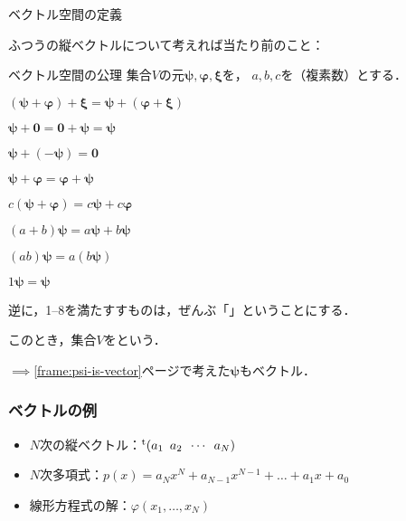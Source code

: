 \documentclass[
    10pt,
    ]{sotsu-beamer}
\begin{document}
\begin{frame}{ベクトル空間の定義}

    ふつうの縦ベクトルについて考えれば当たり前のこと：
    \begin{block}{ベクトル空間の公理}
        集合$V$の元$\symbf{\psi}, \symbf{\varphi}, \symbf{\xi}$を，
        $a, b, c$を（複素数）とする．
        \begin{enumerate}
            \begin{multicols}{2}
                \item $(\symbf{\psi} + \symbf{\varphi}) + \symbf{\xi} = \symbf{\psi} + (\symbf{\varphi} + \symbf{\xi})$
                \item $\symbf{\psi} + \symbf{0} = \symbf{0} + \symbf{\psi} = \symbf{\psi}$
                \item $\symbf{\psi} + (-\symbf{\psi}) = \symbf{0}$
                \item $\symbf{\psi} + \symbf{\varphi} = \symbf{\varphi} + \symbf{\psi}$
                \item $c (\symbf{\psi} + \symbf{\varphi}) = c \symbf{\psi} + c \symbf{\varphi}$
                \item $(a + b) \symbf{\psi} = a \symbf{\psi} + b \symbf{\psi}$
                \item $(ab) \symbf{\psi} = a(b\symbf{\psi})$
                \item $1 \symbf{\psi} = \symbf{\psi}$
            \end{multicols}
        \end{enumerate}
    \end{block}

    \pause

    \alert{逆に，1--8を満たすすものは，ぜんぶ「」ということにする}．
    
    このとき，集合$V$をという．
    
    $\implies$\ref{frame:psi-is-vector}ページで考えた$\symbf{\psi}$もベクトル．

\end{frame}


\begin{frame}
    \frametitle{ベクトルの例}

    \begin{itemize}
        \item $N$次の縦ベクトル：$\cvector{a_1 ; a_2 ; \cdots ; a_N}$
        \item $N$次多項式：$p(x) = a_N x^N + a_{N-1} x^{N-1} + \dots + a_1 x + a_0$
        \item 線形方程式の解：$\varphi(x_1, \dots, x_N)$
    \end{itemize}

    

\end{frame}
\end{document}
